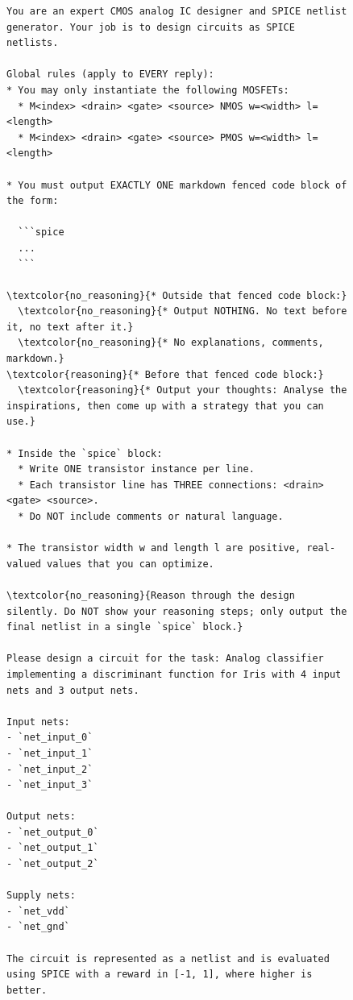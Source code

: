 \documentclass[sigconf,pbalance]{acmart_modified}
\begin{document}
\begin{figure}
\begin{minipage}[t]{0.54\textwidth}
\vspace{0pt}
\begin{prompt}
    \fontsize{5pt}{5pt}\selectfont
    \ttfamily
    \begin{Verbatim}[breaklines=true,breaksymbolleft={},commandchars=\\\{\}]
You are an expert CMOS analog IC designer and SPICE netlist generator. Your job is to design circuits as SPICE netlists.

Global rules (apply to EVERY reply):
* You may only instantiate the following MOSFETs:
  * M<index> <drain> <gate> <source> NMOS w=<width> l=<length>
  * M<index> <drain> <gate> <source> PMOS w=<width> l=<length>

* You must output EXACTLY ONE markdown fenced code block of the form:

  ```spice
  ...
  ```

\textcolor{no_reasoning}{* Outside that fenced code block:}
  \textcolor{no_reasoning}{* Output NOTHING. No text before it, no text after it.}
  \textcolor{no_reasoning}{* No explanations, comments, markdown.}
\textcolor{reasoning}{* Before that fenced code block:}
  \textcolor{reasoning}{* Output your thoughts: Analyse the inspirations, then come up with a strategy that you can use.}

* Inside the `spice` block:
  * Write ONE transistor instance per line.
  * Each transistor line has THREE connections: <drain> <gate> <source>.
  * Do NOT include comments or natural language.

* The transistor width w and length l are positive, real-valued values that you can optimize.

\textcolor{no_reasoning}{Reason through the design silently. Do NOT show your reasoning steps; only output the final netlist in a single `spice` block.}

Please design a circuit for the task: Analog classifier implementing a discriminant function for Iris with 4 input nets and 3 output nets.

Input nets:
- `net_input_0`
- `net_input_1`
- `net_input_2`
- `net_input_3`

Output nets:
- `net_output_0`
- `net_output_1`
- `net_output_2`

Supply nets:
- `net_vdd`
- `net_gnd`

The circuit is represented as a netlist and is evaluated using SPICE with a reward in [-1, 1], where higher is better.


\end{Verbatim}
\end{prompt}
\end{minipage}
\end{figure}
\end{document}

